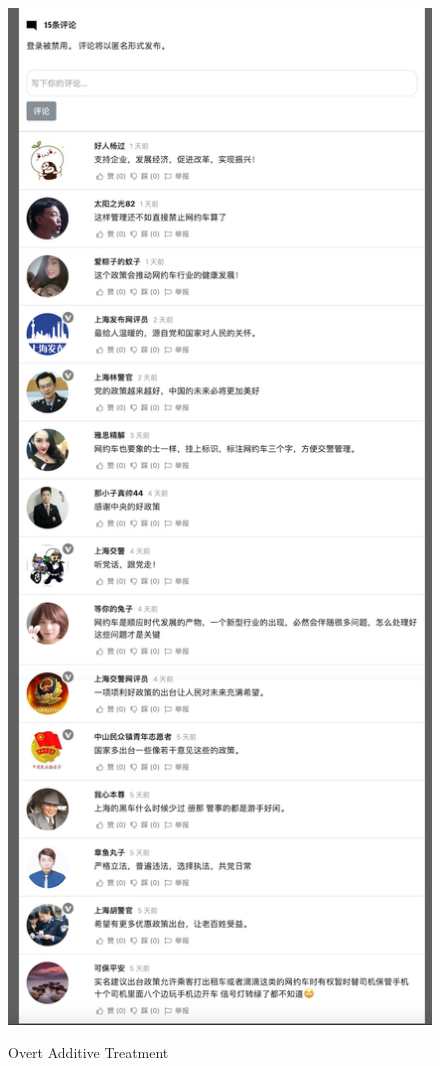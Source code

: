 \documentclass[11pt]{article}
\begin{document}
\begin{figure}
  \centering
  \caption{Overt Additive Treatment}
  \vspace{1em}
  \includegraphics[height=.9\textheight]{figures/overt_additive.png}
  \label{OA}
\end{figure}
\end{document}
